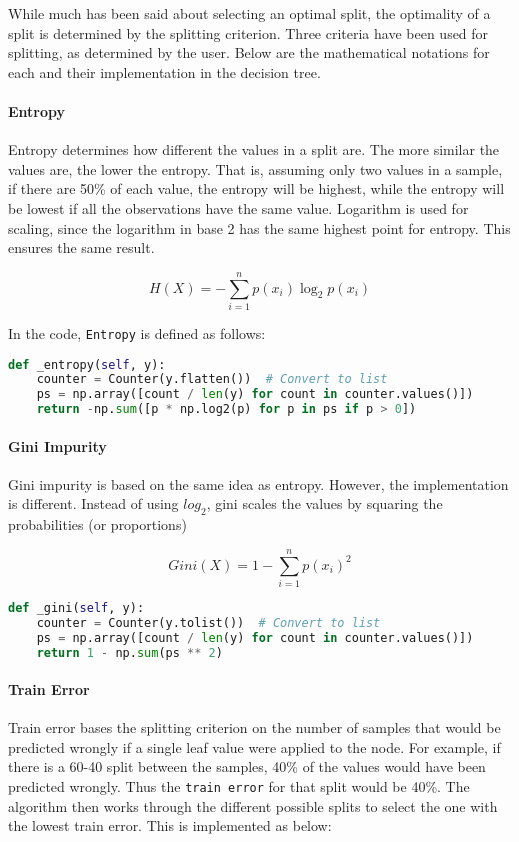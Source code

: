 \documentclass{article}
\begin{document}
While much has been said about selecting an optimal split, the optimality of a split is determined by the splitting criterion. Three criteria have been used for splitting, as determined by the user.
Below are the mathematical notations for each and their implementation in the decision tree.

\paragraph{Entropy}
Entropy determines how different the values in a split are. The more similar the values are, the lower the entropy. That is, assuming only two values in a sample, if there are 50\%  of each value, the entropy will be highest, while the entropy will be lowest if all the observations have the same value. Logarithm is used for scaling, since the logarithm in base 2 has the same highest point for entropy. This ensures the same result.

\[
H(X) = -\sum_{i=1}^{n} p(x_i) \log_2 p(x_i)
\]

In the code, \texttt{Entropy} is defined as follows:

\begin{lstlisting}[language=Python, caption=Entropy function]
def _entropy(self, y):
    counter = Counter(y.flatten())  # Convert to list
    ps = np.array([count / len(y) for count in counter.values()])
    return -np.sum([p * np.log2(p) for p in ps if p > 0])
\end{lstlisting}

\paragraph{Gini Impurity}
Gini impurity is based on the same idea as entropy. However, the implementation is different. Instead of using \( log_2\), gini scales the values by squaring the probabilities (or proportions)

\[
Gini(X) = 1 - \sum_{i=1}^{n} p(x_i)^2
\]

\begin{lstlisting}[language=Python, caption=Gini function]
def _gini(self, y):
    counter = Counter(y.tolist())  # Convert to list
    ps = np.array([count / len(y) for count in counter.values()])
    return 1 - np.sum(ps ** 2)
\end{lstlisting}

\paragraph{Train Error}
Train error bases the splitting criterion on the number of samples that would be predicted wrongly if a single leaf value were applied to the node. For example, if there is a 60-40 split between the samples, 40\% of the values would have been predicted wrongly. Thus the \texttt{train error} for that split would be 40\%. The algorithm then works through the different possible splits to select the one with the lowest train error. This is implemented as below:
\end{document}
